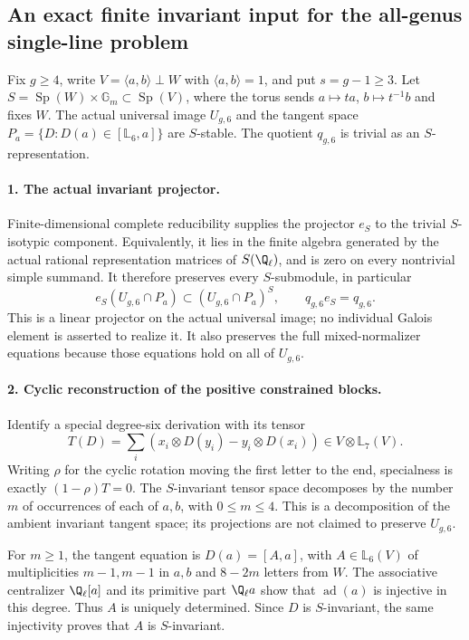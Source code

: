 \subsection*{An exact finite invariant input for the all-genus single-line problem}

Fix $g\geq4$, write $V=\langle a,b\rangle\perp W$ with
$\langle a,b\rangle=1$, and put $s=g-1\geq3$.
Let $S=\operatorname{Sp}(W)\times\mathbb G_m\subset
\operatorname{Sp}(V)$, where the torus sends $a\mapsto ta$,
$b\mapsto t^{-1}b$ and fixes $W$.
The actual universal image $U_{g,6}$ and the tangent space
$P_a=\{D:D(a)\in[\mathbb L_6,a]\}$ are $S$-stable.
The quotient $q_{g,6}$ is trivial as an $S$-representation.

\paragraph{1. The actual invariant projector.}
Finite-dimensional complete reducibility supplies the projector
$e_S$ to the trivial $S$-isotypic component. Equivalently, it
lies in the finite algebra generated by the actual rational
representation matrices of $S(\Q_\ell)$, and is zero on every
nontrivial simple summand. It therefore preserves every
$S$-submodule, in particular
\[
 e_S(U_{g,6}\cap P_a)\subset (U_{g,6}\cap P_a)^S,
                 \qquad q_{g,6}e_S=q_{g,6}.                 \tag{LI.1}
\]
This is a linear projector on the actual universal image;
no individual Galois element is asserted to realize it.
It also preserves the full mixed-normalizer equations because
those equations hold on all of $U_{g,6}$.

\paragraph{2. Cyclic reconstruction of the positive constrained blocks.}
Identify a special degree-six derivation with its tensor
\[
 T(D)=\sum_i(x_i\otimes D(y_i)-y_i\otimes D(x_i))
                       \in V\otimes\mathbb L_7(V).
\]
Writing $\rho$ for the cyclic rotation moving the first letter
to the end, specialness is exactly $(1-\rho)T=0$.
The $S$-invariant tensor space decomposes by the number $m$
of occurrences of each of $a,b$, with $0\leq m\leq4$.
This is a decomposition of the ambient invariant tangent
space; its projections are not claimed to preserve $U_{g,6}$.

For $m\geq1$, the tangent equation is $D(a)=[A,a]$, with
$A\in\mathbb L_6(V)$ of multiplicities $m-1,m-1$ in $a,b$
and $8-2m$ letters from $W$. The associative centralizer
$\Q_\ell[a]$ and its primitive part $\Q_\ell a$ show that
$\operatorname{ad}(a)$ is injective in this degree. Thus $A$
is uniquely determined. Since $D$ is $S$-invariant, the same
injectivity proves that $A$ is $S$-invariant.

